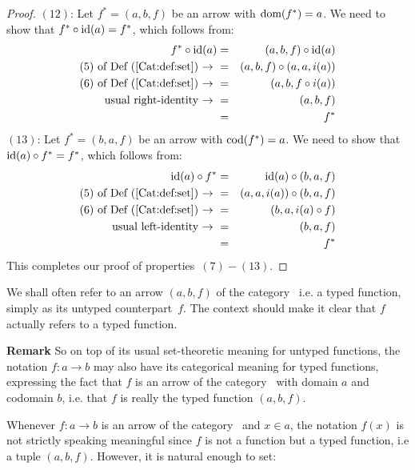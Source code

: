 \begin{proof}
    $(12)$: Let $f^{*}=(a,b,f)$ be an arrow with $\mbox{\rm dom}(f^{*})=a$. We need to 
    show that $f^{*}\circ\mbox{\rm id}(a)=f^{*}$, which follows from:
        \begin{eqnarray*}f^{*}\circ\mbox{\rm id}(a)
            &=&(a,b,f)\circ\mbox{\rm id}(a)\\
            \mbox{$(5)$ of Def~(\ref{Cat:def:set})\ $\rightarrow$\ } 
            &=&(a,b,f)\circ(a,a,i(a))\\
            \mbox{$(6)$ of Def~(\ref{Cat:def:set})\ $\rightarrow$\ } 
            &=&(a,b,f\circ i(a))\\
            \mbox{usual right-identity\ $\rightarrow$\ }
            &=&(a,b,f)\\
            &=&f^{*}
        \end{eqnarray*}
    $(13)$: Let $f^{*}=(b,a,f)$ be an arrow with $\mbox{\rm cod}(f^{*})=a$. We need to 
    show that $\mbox{\rm id}(a)\circ f^{*}=f^{*}$, which follows from:
        \begin{eqnarray*}\mbox{\rm id}(a)\circ f^{*}
            &=&\mbox{\rm id}(a)\circ(b,a,f)\\
            \mbox{$(5)$ of Def~(\ref{Cat:def:set})\ $\rightarrow$\ } 
            &=&(a,a,i(a))\circ(b,a,f)\\
            \mbox{$(6)$ of Def~(\ref{Cat:def:set})\ $\rightarrow$\ } 
            &=&(b,a,i(a)\circ f)\\
            \mbox{usual left-identity\ $\rightarrow$\ }
            &=&(b,a,f)\\
            &=&f^{*}
        \end{eqnarray*}
This completes our proof of properties~$(7)-(13)$.
\end{proof}

\begin{notation}\label{Cat:notation:set:arrow}
    We shall often refer to an arrow $(a,b,f)$ of the category \Set\
    i.e. a typed function, simply as its untyped counterpart~$f$. 
    The context should make it clear that $f$ actually refers to a 
    typed function.
\end{notation}
\noindent
{\bf Remark} So on top of its usual set-theoretic meaning for untyped
functions, the notation $f:a\to b$ may also have its categorical meaning 
for typed functions, expressing the fact that $f$ is an arrow of the 
category \Set\ with domain $a$ and codomain $b$, i.e. that $f$ is really 
the typed function $(a,b,f)$. 

Whenever $f:a\to b$ is an arrow of the category \Set\ and $x\in a$, the
notation $f(x)$ is not strictly speaking meaningful since $f$ is not
a function but a typed function, i.e a tuple $(a,b,f)$. However, it is
natural enough to set:

